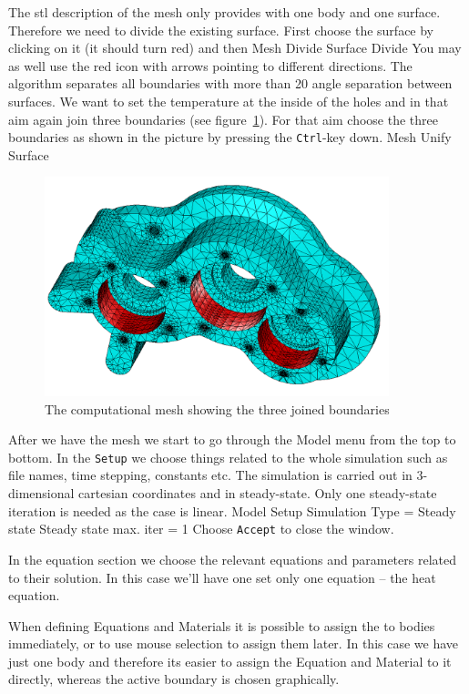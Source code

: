The stl description of the mesh only provides with one body and one surface. 
Therefore we need to divide the 
existing surface. First choose the surface by clicking on it (it should turn red) and then 
\ttbegin
Mesh 
  Divide Surface
    Divide
\ttend
You may as well use the red icon with arrows pointing to different directions. 
The algorithm separates all boundaries with more than 20 angle separation between surfaces.
We want to set the temperature at the inside of the holes and in that aim again join three boundaries (see figure~\ref{fg:bcs_chosen}).
For that aim choose the three boundaries as shown in the picture by pressing the \texttt{Ctrl}-key down.
\ttbegin
Mesh 
  Unify Surface
\ttend
\begin{figure}
\begin{center}
\includegraphics[width=100mm]{bcs_chosen}
\caption{The computational mesh showing the three joined boundaries}\label{fg:bcs_chosen}
\end{center}
\end{figure}

After we have the mesh we start to go through the Model menu from the top to bottom. 
In the \texttt{Setup} we choose things related to the whole simulation such as file names, 
time stepping, constants etc.
The simulation is carried out in 3-dimensional cartesian
coordinates and in steady-state. 
Only one steady-state iteration is needed as the case is linear. 
\ttbegin
Model
  Setup 
    Simulation Type = Steady state
    Steady state max. iter = 1
\ttend
Choose \texttt{Accept} to close the window.

In the equation section we choose the relevant equations and parameters related to their solution. 
In this case we'll have one set only one equation -- the heat equation.

When defining Equations and Materials it is possible to assign the to bodies immediately, or to use mouse
selection to assign them later. In this case we have just one body and therefore its easier to assign 
the Equation and Material to it directly, whereas the active boundary is chosen graphically.

